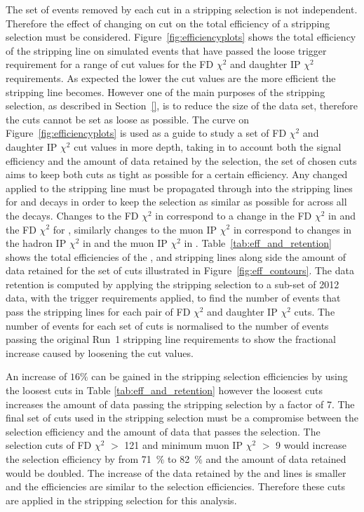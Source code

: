 The set of events removed by each cut in a stripping selection is not independent. Therefore the effect of changing on cut on the total efficiency of a stripping selection must be considered. Figure~\ref{fig:efficiencyplots} shows the total efficiency of the \bsmumu stripping line on simulated \bsmumu events that have passed the loose trigger requirement for a range of cut values for the FD $\chi^{2}$ and daughter IP $\chi^{2}$ requirements. As expected the lower the cut values are the more efficient the stripping line becomes. However one of the main purposes of the stripping selection, as described in Section~\ref{}, is to reduce the size of the data set, therefore the cuts cannot be set as loose as possible. The curve on Figure~\ref{fig:efficiencyplots} is used as a guide to study a set of FD $\chi^{2}$ and daughter IP $\chi^{2}$ cut values in more depth, taking in to account both the signal efficiency and the amount of data retained by the selection, the set of chosen cuts aims to keep both cuts as tight as possible for a certain efficiency. Any changed applied to the \bmumu stripping line must be propagated through into the stripping lines for \bhh and \bujpsik decays in order to keep the selection as similar as possible for across all the decays. Changes to the \bsd FD $\chi^{2}$ in \bsmumu correspond to a change in the \bsd FD $\chi^{2}$ in \bhh and the \jpsi FD $\chi^{2}$ for \bujpsik, similarly changes to the muon IP $\chi^{2}$ in \bsmumu correspond to changes in the hadron IP $\chi^{2}$ in \bhh and the muon IP $\chi^{2}$ in \bujpsik. Table~\ref{tab:eff_and_retention} shows the total efficiencies of the \bmumu, \bhh and \bujpsik stripping lines along side the amount of data retained for the set of cuts illustrated in Figure~\ref{fig:eff_contours}. The data retention is computed by applying the stripping selection to a sub-set of 2012 data, with the trigger requirements applied, to find the number of events that pass the stripping lines for each pair of FD $\chi^{2}$ and daughter IP $\chi^{2}$ cuts. The number of events for each set of cuts is normalised to the number of events passing the original Run~1 stripping line requirements  to show the fractional increase caused by loosening the cut values. 

An increase of $16\%$ can be gained in the stripping selection efficiencies by using the loosest cuts in Table \ref{tab:eff_and_retention} however the loosest cuts increases the amount of data passing the \bmumu stripping selection by a factor of 7. The final set of cuts used in the stripping selection must be a compromise between the selection efficiency and the amount of data that passes the selection. The selection cuts of \bs FD $\chi^{2}$ $>$ 121 and minimum muon IP $\chi^{2}$ $>$ 9 would increase the \bmumu selection efficiency by from 71~$\%$ to 82~$\%$ and the amount of data retained would be doubled. The increase of the data retained by the \bhh and \bujpsik lines is smaller and the efficiencies are similar to the \bmumu selection efficiencies. Therefore these cuts are applied in the stripping selection for this analysis. %

